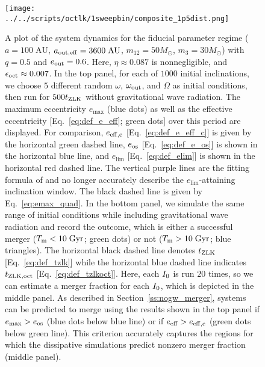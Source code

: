 \documentclass[
        fleqn,
        usenatbib,
    ]{mnras}
\newlength{\colummwidth}
\begin{document}
\begin{figure}
    \centering
    \texttt{[image: ../../scripts/octlk/1sweepbin/composite\_1p5dist.png]}
    \caption{A plot of the system dynamics for the fiducial parameter regime ($a
    = 100\;\mathrm{AU}$, $a_{\rm out, eff} = 3600\;\mathrm{AU}$, $m_{12} =
    50M_{\odot}$, $m_3 = 30M_{\odot}$) with $q = 0.5$ and $e_{\rm out} = 0.6$.
    Here, $\eta \approx 0.087$ is nonnegligible, and $\epsilon_{\rm oct} \approx
    0.007$. In the top panel, for each of $1000$ initial inclinations, we choose
    $5$ different random $\omega$, $\omega_{\rm out}$, and $\Omega$ as initial
    conditions, then run for $500t_{\rm ZLK}$ without gravitational wave
    radiation. The maximum eccentricity $e_{\max}$ (blue dots) as well as the
    effective eccentricity [Eq.~\eqref{eq:def_e_eff}; green dots] over this
    period are displayed. For comparison, $e_{\rm eff, c}$
    [Eq.~\eqref{eq:def_e_eff_c}] is given by the horizontal green dashed line,
    $e_{\rm os}$ [Eq.~\eqref{eq:def_e_os}] is shown in the horizontal blue line,
    and $e_{\lim}$ [Eq.~\eqref{eq:def_elim}] is shown in the horizontal red
    dashed line. The vertical purple lines are the fitting formula of
    \citet{MLL16} and no longer accurately describe the $e_{\lim}$-attaining
    inclination window. The black dashed line is given by
    Eq.~\eqref{eq:emax_quad}. In the bottom panel, we simulate the same range of
    initial conditions while including gravitational wave radiation and record
    the outcome, which is either a successful merger ($T_{\rm m} <
    10\;\mathrm{Gyr}$; green dots) or not ($T_{\rm m} > 10\;\mathrm{Gyr}$; blue
    triangles). The horizontal black dashed line denotes $t_{\rm ZLK}$
    [Eq.~\eqref{eq:def_tzlk}] while the horizontal blue dashed line indicates
    $t_{\rm ZLK, oct}$ [Eq.~\eqref{eq:def_tzlkoct}]. Here, each $I_{\rm 0}$ is
    run $20$ times, so we can estimate a merger fraction for each $I_{\rm
    0}$, which is depicted in the middle panel. As described in
    Section~\ref{ss:nogw_merger}, systems can be predicted to merge using the
    results shown in the top panel if $e_{\max} > e_{\rm os}$ (blue dots below
    blue line) or if $e_{\rm eff} > e_{\rm eff, c}$ (green dots below green
    line). This criterion accurately captures the regions for which the
    dissipative simulations predict nonzero merger fraction (middle panel).
    }\label{fig:composite_dist}
\end{figure}
\end{document}
